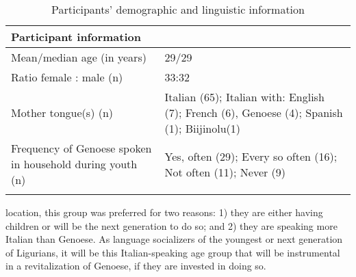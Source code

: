 \documentclass[output=paper,colorlinks,citecolor=brown]{langscibook}
\begin{document}
\begin{table}
\begin{tabularx}{\textwidth}{XX}
\lsptoprule
\textbf{Participant information}\\ \midrule
Mean/median age (in years) & 29/29 \\
Ratio female : male (n) & 33:32 \\
Mother tongue(s) (n) & Italian (65); Italian with: English (7); French (6), Genoese (4); Spanish (1); Biijinolu\footnotemark (1) \\
Frequency of Genoese spoken in household during youth (n) & Yes, often (29); Every so often (16); Not often (11); Never (9) \\  
\lspbottomrule
\end{tabularx}
\caption{Participants’ demographic and linguistic information}
\label{tab:licata:01}
\end{table}

location, this group was preferred for two reasons: 1) they are either having children or will be the next generation to do so; and 2) they are speaking more Italian than Genoese. As language socializers of the youngest or next generation of Ligurians, it will be this Italian-speaking age group that will be instrumental in a revitalization of Genoese, if they are invested in doing so.
\end{document}
